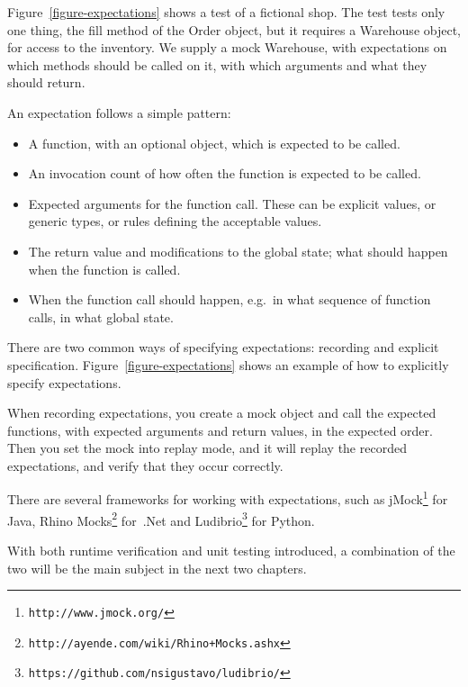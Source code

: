 \documentclass[a4paper,11pt]{kth-mag}
\begin{document}
Figure~\ref{figure-expectations} shows a test of a fictional shop. The test
tests only one thing, the fill method of the Order object, but it requires a
Warehouse object, for access to the inventory. We supply a mock Warehouse, with
expectations on which methods should be called on it, with which arguments and
what they should return.

An expectation follows a simple pattern:

\begin{itemize}
	\item A function, with an optional object, which is expected to be called.
	\item An invocation count of how often the function is expected to be called.
	\item Expected arguments for the function call. These can be explicit values,
		or generic types, or rules defining the acceptable values.
	\item The return value and modifications to the global state; what should
		happen when the function is called.
	\item When the function call should happen, e.g.\ in what sequence of
		function calls, in what global state.
\end{itemize}

There are two common ways of specifying expectations: recording and explicit
specification. Figure~\ref{figure-expectations} shows an example of how to
explicitly specify expectations.

When recording expectations, you create a mock object and call the expected
functions, with expected arguments and return values, in the expected order.
Then you set the mock into replay mode, and it will replay the recorded
expectations, and verify that they occur correctly.

There are several frameworks for working with expectations, such as
jMock\footnote{\texttt{http://www.jmock.org/}} for Java, Rhino
Mocks\footnote{\texttt{http://ayende.com/wiki/Rhino+Mocks.ashx}} for~.Net and
Ludibrio\footnote{\texttt{https://github.com/nsigustavo/ludibrio/}} for Python.

With both runtime verification and unit testing introduced, a combination of
the two will be the main subject in the next two chapters.





\end{document}
